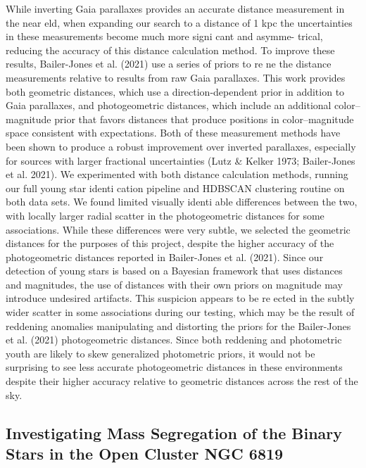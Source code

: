 \documentclass[../main.tex]{subfiles}
\begin{document}
{While inverting Gaia parallaxes provides an accurate
distance measurement in the near eld, when expanding our
search to a distance of 1 kpc the uncertainties in these
measurements become much more signi cant and asymme-
trical, reducing the accuracy of this distance calculation method. To improve these results, Bailer-Jones et al. (2021)
use a series of priors to re ne the distance measurements
relative to results from raw Gaia parallaxes. This work provides
both geometric distances, which use a direction-dependent
prior in addition to Gaia parallaxes, and photogeometric
distances, which include an additional color–magnitude prior
that favors distances that produce positions in color–magnitude
space consistent with expectations. Both of these measurement
methods have been shown to produce a robust improvement
over inverted parallaxes, especially for sources with larger
fractional uncertainties (Lutz & Kelker 1973; Bailer-Jones et al.
2021). We experimented with both distance calculation
methods, running our full young star identi cation pipeline
and HDBSCAN clustering routine on both data sets. We found
limited visually identi able differences between the two, with
locally larger radial scatter in the photogeometric distances for
some associations. While these differences were very subtle,
we selected the geometric distances for the purposes of this
project, despite the higher accuracy of the photogeometric
distances reported in Bailer-Jones et al. (2021). Since our
detection of young stars is based on a Bayesian framework that
uses distances and magnitudes, the use of distances with their
own priors on magnitude may introduce undesired artifacts.
This suspicion appears to be re ected in the subtly wider scatter
in some associations during our testing, which may be the
result of reddening anomalies manipulating and distorting the
priors for the Bailer-Jones et al. (2021) photogeometric
distances. Since both reddening and photometric youth are
likely to skew generalized photometric priors, it would not be
surprising to see less accurate photogeometric distances in
these environments despite their higher accuracy relative to
geometric distances across the rest of the sky.

\subsection{Investigating Mass Segregation of the Binary Stars in the Open Cluster NGC 6819}

}
\end{document}
